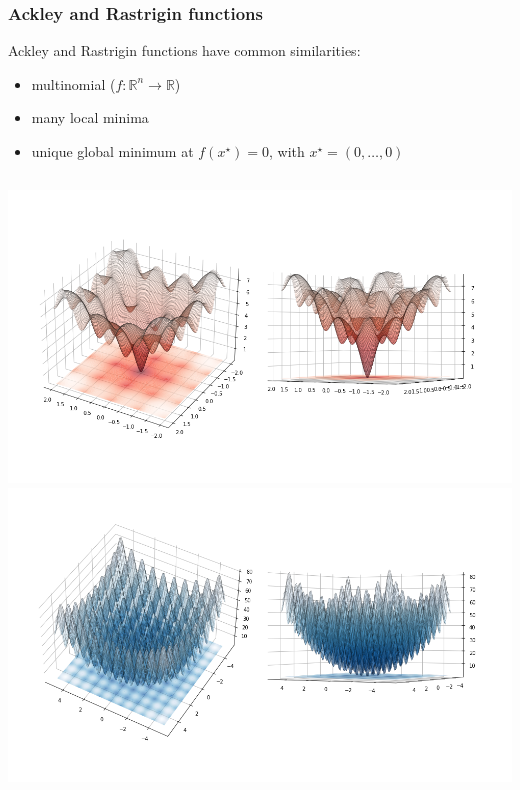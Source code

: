 \documentclass{beamer}
\begin{document}
\begin{frame}
\frametitle{Ackley and Rastrigin functions}
Ackley and Rastrigin functions have common similarities:
  \begin{itemize}
    \item multinomial ($f:\mathbb{R}^n \rightarrow \mathbb{R}$)
    \item many local minima
    \item unique global minimum at $f(x^{\star}) = 0$, with $x^{\star} = (0, \dots, 0)$
  \end{itemize}
  \begin{columns}[t]
      \centering
      \includegraphics[width=1.0\textwidth]{figures/introduction-ackley}
      \centering
      \includegraphics[width=1.0\textwidth]{figures/introduction-rastrigin}
  \end{columns}
\end{frame}
\end{document}
